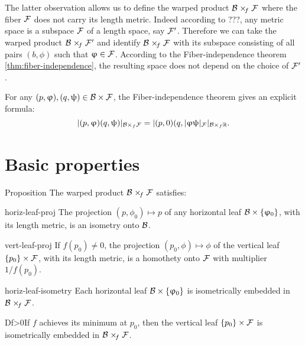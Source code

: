 The latter observation allows us to define the warped product $\spc{B}\warp{f} \spc{F}$ where the fiber $\mathcal{F}$ does not carry its length metric.
Indeed according to ???, any metric space is a subspace $\mathcal{F}$ of a length space, say $\mathcal{F}'$.
Therefore we can take the warped product $\spc{B}\warp{f} \spc{F}'$
and identify $\spc{B}\warp{f} \spc{F}$ with its subspace consisting of all pairs $(b,\phi)$ such that $\phi\in \spc{F}$.
According to the Fiber-independence theorem \ref{thm:fiber-independence}, the resulting space does not depend on the choice of $\mathcal{F}'$.

For any $(p,\phi),(q,\psi) \in \spc{B}\times \spc{F}$, the Fiber-independence theorem gives an explicit formula:
\[
|(p,\phi)(q,\psi)|_{\spc{B}\times_f \spc{F}} =
|(p,0)(q,|\phi \psi|_{\spc{F}}|_{\spc{B}\times_f\R}.
\]


\section{Basic properties}
\label{sec:wp-properties}

\begin{thm}{Proposition}
The warped product $\spc{\spc{B}}\warp{f}\spc{F}$ satisfies:

\begin{subthm}{horiz-leaf-proj}
The projection $(p,\phi_0)\mapsto p$  of any  horizontal leaf $\spc{B}\times\{\phi_0\}$, with its length metric,  is an isometry onto $\mathcal{B}$.
\end{subthm}

\begin{subthm}{vert-leaf-proj}
If $f(p_0)\ne0$, the projection $(p_0,\phi)\mapsto \phi$ of the vertical leaf $\{p_0\}\times \spc{F}$, with its length metric,  is a homothety onto $\mathcal{F}$ with multiplier $1/f(p_0)$.
\end{subthm}


\begin{subthm}{horiz-leaf-isometry}
Each horizontal leaf $\spc{B}\times\{\phi_0\}$ is isometrically embedded in $\spc{B}\warp{f}\spc{F}$.
\end{subthm}


\begin{subthm}{Df>0}If  $f$ achieves its minimum at $p_0$, then the vertical leaf $\{p_0\} \times \spc{F}$ is isometrically embedded in $\spc{B}\warp{f}\spc{F}$.
\end{subthm}

\end{thm}


